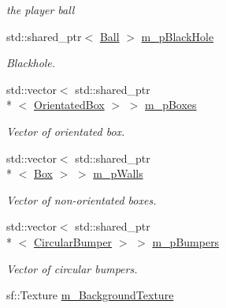 \begin{DoxyCompactItemize}
\begin{DoxyCompactList}\small\item\em the player ball \end{DoxyCompactList}\item 
\hypertarget{class_pinball_scene_ae9b2a7e5fe0e0334ac2e4a5238f8fe3f}{std\+::shared\+\_\+ptr$<$ \hyperlink{class_ball}{Ball} $>$ \hyperlink{class_pinball_scene_ae9b2a7e5fe0e0334ac2e4a5238f8fe3f}{m\+\_\+p\+Black\+Hole}}\label{class_pinball_scene_ae9b2a7e5fe0e0334ac2e4a5238f8fe3f}

\begin{DoxyCompactList}\small\item\em Blackhole. \end{DoxyCompactList}\item 
\hypertarget{class_pinball_scene_a82759060543078ac218315d2a13618c1}{std\+::vector$<$ std\+::shared\+\_\+ptr\\*
$<$ \hyperlink{class_orientated_box}{Orientated\+Box} $>$ $>$ \hyperlink{class_pinball_scene_a82759060543078ac218315d2a13618c1}{m\+\_\+p\+Boxes}}\label{class_pinball_scene_a82759060543078ac218315d2a13618c1}

\begin{DoxyCompactList}\small\item\em Vector of orientated box. \end{DoxyCompactList}\item 
\hypertarget{class_pinball_scene_a56a94580b385ae849a4f9e90632e6ba0}{std\+::vector$<$ std\+::shared\+\_\+ptr\\*
$<$ \hyperlink{class_box}{Box} $>$ $>$ \hyperlink{class_pinball_scene_a56a94580b385ae849a4f9e90632e6ba0}{m\+\_\+p\+Walls}}\label{class_pinball_scene_a56a94580b385ae849a4f9e90632e6ba0}

\begin{DoxyCompactList}\small\item\em Vector of non-\/orientated boxes. \end{DoxyCompactList}\item 
\hypertarget{class_pinball_scene_a01f8eaffbfe7ba7f83f26006400a5e5c}{std\+::vector$<$ std\+::shared\+\_\+ptr\\*
$<$ \hyperlink{class_circular_bumper}{Circular\+Bumper} $>$ $>$ \hyperlink{class_pinball_scene_a01f8eaffbfe7ba7f83f26006400a5e5c}{m\+\_\+p\+Bumpers}}\label{class_pinball_scene_a01f8eaffbfe7ba7f83f26006400a5e5c}

\begin{DoxyCompactList}\small\item\em Vector of circular bumpers. \end{DoxyCompactList}\item 
\hypertarget{class_pinball_scene_a1e5a61e23b78a270ce4ae4abecc4c85a}{sf\+::\+Texture \hyperlink{class_pinball_scene_a1e5a61e23b78a270ce4ae4abecc4c85a}{m\+\_\+\+Background\+Texture}}\label{class_pinball_scene_a1e5a61e23b78a270ce4ae4abecc4c85a}


\end{DoxyCompactItemize}
